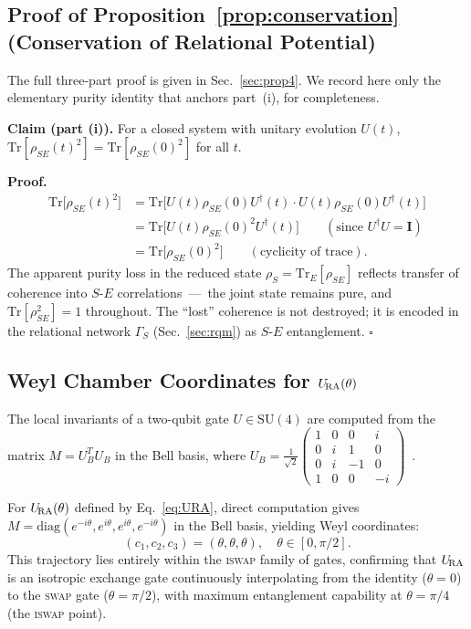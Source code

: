 \subsection{Proof of Proposition~\ref{prop:conservation} (Conservation of Relational Potential)}

The full three-part proof is given in Sec.~\ref{sec:prop4}.
We record here only the elementary purity identity that anchors
part~(i), for completeness.

\textbf{Claim (part (i)).}
For a closed system with unitary evolution $U(t)$,
$\mathrm{Tr}[\rho_{SE}(t)^2] = \mathrm{Tr}[\rho_{SE}(0)^2]$ for all $t$.

\textbf{Proof.}
\begin{align*}
  \mathrm{Tr}\bigl[\rho_{SE}(t)^2\bigr]
    &= \mathrm{Tr}\bigl[U(t)\rho_{SE}(0)U^\dagger(t)\cdot
                        U(t)\rho_{SE}(0)U^\dagger(t)\bigr] \\
    &= \mathrm{Tr}\bigl[U(t)\rho_{SE}(0)^2 U^\dagger(t)\bigr]
      \qquad (\text{since } U^\dagger U = \mathbf{I}) \\
    &= \mathrm{Tr}\bigl[\rho_{SE}(0)^2\bigr]
      \qquad (\text{cyclicity of trace}).
\end{align*}
The apparent purity loss in the reduced state
$\rho_S = \mathrm{Tr}_E[\rho_{SE}]$ reflects transfer of coherence
into $S$-$E$ correlations~---~the joint state remains pure, and
$\mathrm{Tr}[\rho_{SE}^2] = 1$ throughout.
The ``lost'' coherence is not destroyed; it is encoded in the
relational network $\Gamma_S$ (Sec.~\ref{sec:rqm}) as $S$-$E$
entanglement. $\square$

\subsection{Weyl Chamber Coordinates for $U_{\!\mathrm{RA}}(\theta)$}

The local invariants of a two-qubit gate $U \in \mathrm{SU}(4)$ are
computed from the matrix $M = U^T_B U_B$ in the Bell basis, where
$U_B = \frac{1}{\sqrt{2}}\begin{pmatrix}1&0&0&i\\0&i&1&0\\0&i&{-1}&0\\1&0&0&{-i}\end{pmatrix}$~\cite{Zhang2003WeylChamber}.

For $U_{\!\mathrm{RA}}(\theta)$ defined by Eq.~\eqref{eq:URA}, direct computation gives
$M = \mathrm{diag}(e^{-i\theta}, e^{i\theta}, e^{i\theta}, e^{-i\theta})$
in the Bell basis, yielding Weyl coordinates:
\begin{equation}
  (c_1, c_2, c_3) = (\theta, \theta, \theta), \quad \theta \in [0, \pi/2].
  \label{eq:weyl-full}
\end{equation}
This trajectory lies entirely within the \textsc{iswap} family of gates,
confirming that $U_{\!\mathrm{RA}}$ is an isotropic exchange gate continuously
interpolating from the identity ($\theta = 0$) to the \textsc{swap}
gate ($\theta = \pi/2$), with maximum entanglement capability at
$\theta = \pi/4$ (the \textsc{iswap} point).

